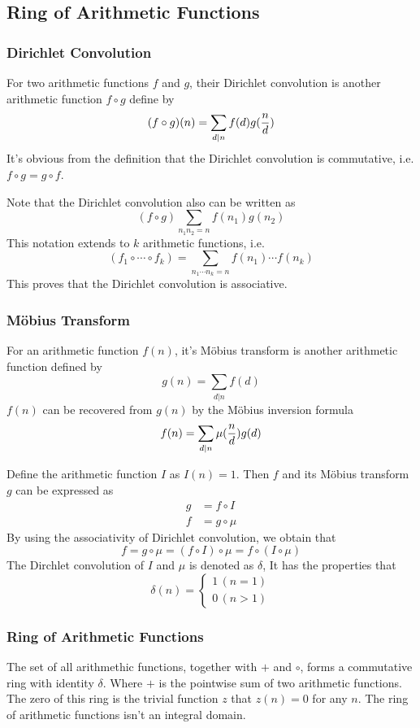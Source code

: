 \documentclass{article}
\begin{document}
\subsection{Ring of Arithmetic Functions}
\subsubsection*{Dirichlet Convolution}
For two arithmetic functions $f$ and $g$, their Dirichlet convolution
is another arithmetic function $f \circ g$ define by
$$(f \circ g)(n) = \sum_{d \vert n} f(d) g({n \over d})$$
It's obvious from the definition that the Dirichlet convolution is commutative,
i.e. $f \circ g = g \circ f$.

Note that the Dirichlet convolution also can be written as
$$(f \circ g) \sum_{n_1 n_2 = n} f(n_1) g(n_2)$$
This notation extends to $k$ arithmetic functions,
i.e. $$(f_1 \circ \cdots \circ f_k) = \sum_{n_1 \cdots n_k = n} f(n_1) \cdots f(n_k)$$
This proves that the Dirichlet convolution is associative.

\subsubsection*{M\"obius Transform}
For an arithmetic function $f(n)$, it's M\"obius transform is another arithmetic function
defined by $$g(n) = \sum_{d \vert n} f(d)$$
$f(n)$ can be recovered from $g(n)$ by the M\"obius inversion formula
$$f(n) = \sum_{d \vert n} \mu({n \over d}) g(d)$$

Define the arithmetic function $I$ as $I(n) = 1$.
Then $f$ and its M\"obius transform $g$ can be expressed as
\begin{align*}
  g &= f \circ I \\
  f &= g \circ \mu
\end{align*}
By using the associativity of Dirichlet convolution, we obtain that
$$f = g \circ \mu = (f \circ I) \circ \mu = f \circ (I \circ \mu)$$
The Dirchlet convolution of $I$ and $\mu$ is denoted as $\delta$,
It has the properties that
\begin{equation*}
  \delta(n) =
  \begin{cases}
    1 \, (n = 1) \\
    0 \, (n > 1)
  \end{cases}
\end{equation*}

\subsubsection*{Ring of Arithmetic Functions}
The set of all arithmethic functions, together with $+$ and $\circ$, forms a commutative ring with identity $\delta$.
Where $+$ is the pointwise sum of two arithmetic functions.
The zero of this ring is the trivial function $z$ that $z(n) = 0$ for any $n$.
The ring of arithmetic functions isn't an integral domain.
\end{document}
